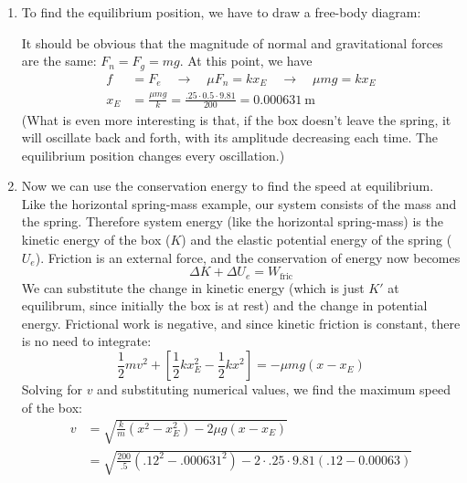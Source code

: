 \begin{example}
  \begin{enumerate}[leftmargin=15pt]%
  \item To find the equilibrium position, we have to draw a free-body diagram:
    \begin{center}
    \end{center}
    It should be obvious that the magnitude of normal and gravitational forces
    are the same: $F_n=F_g=mg$. At this point, we have
    \begin{align*}
      f &=F_e\quad\rightarrow\quad \mu F_n=kx_E
      \quad\rightarrow\quad \mu mg=kx_E\\
      x_E&=\frac{\mu mg}k=\frac{.25\cdot0.5\cdot9.81}{200}=\SI{0.000631}\metre
    \end{align*}
    (What is even more interesting is that, if the box doesn't leave the spring,
    it will oscillate back and forth, with its amplitude decreasing each time.
    The equilibrium position changes every oscillation.)
  \item Now we can use the conservation energy to find the speed at
    equilibrium. Like the horizontal spring-mass example, our system consists
    of the mass and the spring. Therefore system energy (like the horizontal
    spring-mass) is the kinetic energy of the box ($K$) and the elastic
    potential energy of the spring ($U_e$). Friction is an external force, and
    the conservation of energy now becomes
    \begin{equation*}
      \Delta K + \Delta U_e = W_\text{fric}
    \end{equation*}
    We can substitute the change in kinetic energy (which is just $K'$ at
    equilibrum, since initially the box is at rest) and the change in potential
    energy. Frictional work is negative, and since kinetic friction is constant,
    there is no need to integrate:
    \begin{equation*}
      \frac12mv^2 + \left[\frac12kx_E^2-\frac12kx^2\right] = -\mu mg(x-x_E)
    \end{equation*}
    Solving for $v$ and substituting numerical values, we find the maximum
    speed of the box:
    \begin{align*}
      v &= \sqrt{\frac km\left(x^2-x_E^2\right)-2\mu g(x-x_E)}\\
      &= \sqrt{\frac{200}{.5}\left(.12^2-.000631^2\right)
        -2\cdot.25\cdot9.81(.12-0.00063)}\\
    \end{align*}
  \end{enumerate}
\end{example}

